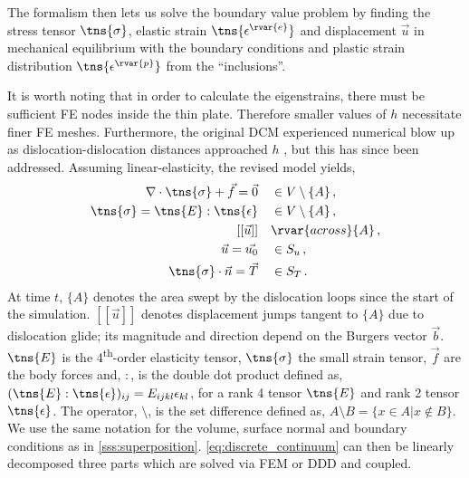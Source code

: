 The formalism then lets us solve the boundary value problem by finding the stress tensor $ \tns{\sigma} $, elastic strain $ \tns{\epsilon^{\rvar{e}}} $ and displacement $ \vec{u} $ in mechanical equilibrium with the boundary conditions and plastic strain distribution $ \tns{\epsilon^{\rvar{p}}} $ from the ``inclusions''.

It is worth noting that in order to calculate the eigenstrains, there must be sufficient FE nodes inside the thin plate. Therefore smaller values of $ h $ necessitate finer FE meshes. Furthermore, the original DCM experienced numerical blow up as dislocation-dislocation distances approached $ h $ \cite{dcm0}, but this has since been addressed. Assuming linear-elasticity, the revised model \cite{dcm} yields,
\begin{subequations}\label{eq:discrete_continuum}
    \begin{align}
        \nabla \cdot \tns{\sigma} + \vec{f} = \vec{0} \quad & \in V \setminus \{A\}\,, \\
        \tns{\sigma} = \tns{E} : \tns{\epsilon} \quad       & \in V \setminus \{A\}\,, \\
        [[\vec{u}]] \quad                                   & \rvar{across } \{A\}\,,  \\
        \vec{u} = \vec{u_{0}} \quad                         & \in S_{u}\,,             \\
        \tns{\sigma} \cdot \vec{n} = \vec{T} \quad          & \in S_{T}\,.
    \end{align}
\end{subequations}
At time $ t $, $ \{A\} $ denotes the area swept by the dislocation loops since the start of the simulation. $ [[\vec{u}]] $ denotes displacement jumps tangent to $ \{A\} $ due to dislocation glide; its magnitude and direction depend on the Burgers vector $ \vec{b} $. $ \tns{E} $ is the 4\textsuperscript{th}-order elasticity tensor, $ \tns{\sigma} $ the small strain tensor, $ \vec{f} $ are the body forces and, $ : $, is the double dot product defined as, $ (\tns{E}:\tns{\epsilon})_{ij} = E_{ijkl}\epsilon_{kl} $, for a rank 4 tensor $ \tns{E} $ and rank 2 tensor $ \tns{\epsilon} $. The operator, $ \setminus $, is the set difference defined as, $ A \setminus B = \{x \in A | x \notin B\} $. We use the same notation for the volume, surface normal and boundary conditions as in \cref{sss:superposition}. \cref{eq:discrete_continuum} can then be linearly decomposed three parts which are solved via FEM or DDD and coupled.

